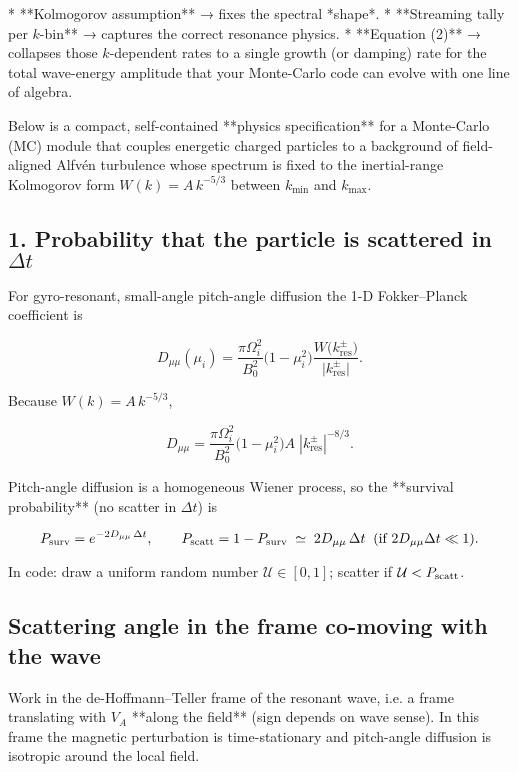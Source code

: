 * **Kolmogorov assumption** → fixes the spectral *shape*.
* **Streaming tally per $k$-bin** → captures the correct resonance physics.
* **Equation (2)** → collapses those $k$-dependent rates to a single growth (or damping) rate for the total wave-energy amplitude that your Monte-Carlo code can evolve with one line of algebra.


Below is a compact, self-contained **physics specification** for a Monte-Carlo (MC) module that couples energetic charged particles to a background of field-aligned Alfvén turbulence whose spectrum is fixed to the inertial-range Kolmogorov form
$W(k)=A\,k^{-5/3}$ between $k_{\min }$ and $k_{\max }$.



\subsection{ 1.  Probability that the particle is scattered in $\Delta t$}

For gyro-resonant, small-angle pitch-angle diffusion the 1-D Fokker–Planck coefficient is

$$
D_{\mu\mu}(\mu_i)=\frac{\pi \Omega_i^{2}}{B_0^{2}}\bigl(1-\mu_i^{2}\bigr)
\frac{W\!\bigl(k_{\text{res}}^{\pm}\bigr)}{\,\lvert k_{\text{res}}^{\pm}\rvert\,}.
$$

Because $W(k)=A\,k^{-5/3}$,

$$
D_{\mu\mu}= \frac{\pi \Omega_i^{2}}{B_0^{2}}\bigl(1-\mu_i^{2}\bigr)
A\;|k_{\text{res}}^{\pm}|^{-8/3}.
$$

Pitch-angle diffusion is a homogeneous Wiener process, so the **survival probability** (no scatter in $\Delta t$) is

$$
P_{\rm surv}=e^{-2D_{\mu\mu}\,\Delta t},
\qquad
P_{\rm scatt}=1-P_{\rm surv}\;\simeq\;2D_{\mu\mu}\,\Delta t\;\;(\text{if }2D_{\mu\mu}\Delta t\ll1).
$$

In code: draw a uniform random number $\mathcal U\in[0,1]$; scatter if $\mathcal U<P_{\rm scatt}$.

\subsection{Scattering angle in the frame co-moving with the wave}

Work in the de-Hoffmann–Teller frame of the resonant wave, i.e. a frame translating with $V_A$ **along the field** (sign depends on wave sense).
In this frame the magnetic perturbation is time-stationary and pitch-angle diffusion is isotropic around the local field.

